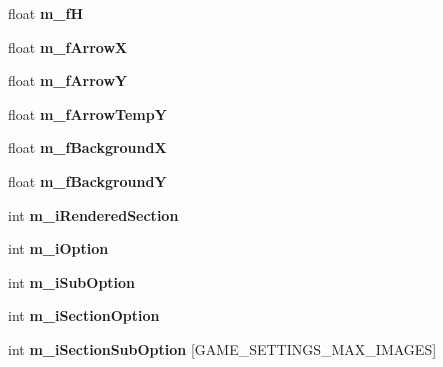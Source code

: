 \begin{DoxyCompactItemize}
\mbox{\label{struct_c_main_menu_a2d55327447562affae2259e4013101f3}} 
float {\bfseries m\+\_\+fH}
\item 
\mbox{\label{struct_c_main_menu_a2099be91eef6c912b655dfe27defdb93}} 
float {\bfseries m\+\_\+f\+ArrowX}
\item 
\mbox{\label{struct_c_main_menu_a0d73bfeccb6636d4d624b6d32f443a1f}} 
float {\bfseries m\+\_\+f\+ArrowY}
\item 
\mbox{\label{struct_c_main_menu_a5693723815004934cf33865353038d4f}} 
float {\bfseries m\+\_\+f\+Arrow\+TempY}
\item 
\mbox{\label{struct_c_main_menu_ae26db77c5060eb0a59c84890a3084cd9}} 
float {\bfseries m\+\_\+f\+BackgroundX}
\item 
\mbox{\label{struct_c_main_menu_af80bdc6252c94cc12703e5829282341d}} 
float {\bfseries m\+\_\+f\+BackgroundY}
\item 
\mbox{\label{struct_c_main_menu_a603bac51c948f227f4e87563ad816941}} 
int {\bfseries m\+\_\+i\+Rendered\+Section}
\item 
\mbox{\label{struct_c_main_menu_a5c5d4ed063de45836e0ee9396827178d}} 
int {\bfseries m\+\_\+i\+Option}
\item 
\mbox{\label{struct_c_main_menu_aa3f91c7814ffd564326dd1bd8375dbd5}} 
int {\bfseries m\+\_\+i\+Sub\+Option}
\item 
\mbox{\label{struct_c_main_menu_a4eb9cc756dbe0a7e5c95dca38d9d2d50}} 
int {\bfseries m\+\_\+i\+Section\+Option}
\item 
\mbox{\label{struct_c_main_menu_a916fe605871c47376ca45d145fad8488}} 
int {\bfseries m\+\_\+i\+Section\+Sub\+Option} \mbox{[}G\+A\+M\+E\+\_\+\+S\+E\+T\+T\+I\+N\+G\+S\+\_\+\+M\+A\+X\+\_\+\+I\+M\+A\+G\+ES\mbox{]}
\item 
\mbox{\label{struct_c_main_menu_a8e9a60d4240db4c86371abcbf6421bda}} 

\end{DoxyCompactItemize}
